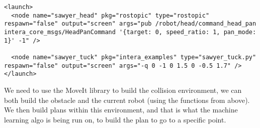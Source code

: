 \documentclass{article}
\begin{document}
\begin{verbatim}
<launch>
  <node name="sawyer_head" pkg="rostopic" type="rostopic" respawn="false" output="screen" args="pub /robot/head/command_head_pan intera_core_msgs/HeadPanCommand '{target: 0, speed_ratio: 1, pan_mode: 1}' -1" />

  <node name="sawyer_tuck" pkg="intera_examples" type="sawyer_tuck.py" respawn="false" output="screen" args="-q 0 -1 0 1.5 0 -0.5 1.7" />
</launch>

\end{verbatim}

We need to use the MoveIt library to build the collision environment, we can both build the obstacle and the current robot (using the functions from above). We then build plans within this environment, and that is what the machine learning algo is being run on, to build the plan to go to a specific point.
\end{document}
